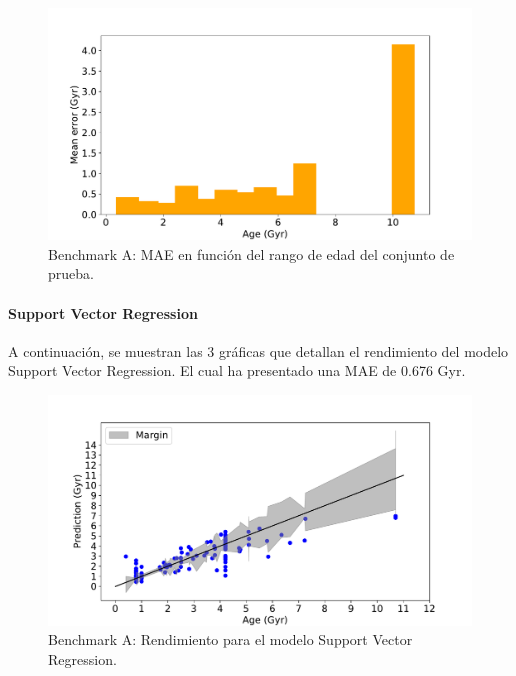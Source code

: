\begin{figure}[H]
\begin{center}
 \includegraphics[width=0.8\linewidth]{Figuras/Experimentos/B_A_rf_3.pdf}
\end{center}
\caption{Benchmark A: MAE en función del rango de edad del conjunto de prueba.}
 \label{fig:benchA_details_rf_3}
\end{figure}

\paragraph{Support Vector Regression} 
A continuación, se muestran las 3 gráficas que detallan el rendimiento del modelo Support Vector Regression. El cual ha presentado una MAE de 0.676 Gyr.

\begin{figure}[H]
\begin{center}
 \includegraphics[width=0.8\linewidth]{Figuras/Experimentos/B_A_svm_1.pdf}
\end{center}
\caption{Benchmark A: Rendimiento para el modelo Support Vector Regression.}
 \label{fig:benchA_details_svm_1}
\end{figure}

